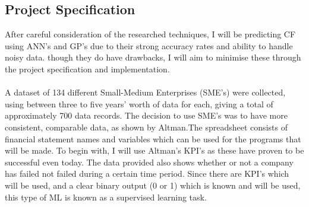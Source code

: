 \documentclass[11pt]{article}
\begin{document}
\subsection{Project Specification}
After careful consideration of the researched techniques, I will be predicting CF using ANN's and GP's due to their strong accuracy rates and ability to handle noisy data. though they do have drawbacks, I will aim to minimise these through the project specification and implementation.\\
\\
A dataset of 134 different Small-Medium Enterprises (SME's) were collected, using between three to five years' worth of data for each, giving a total of approximately 700 data records. The decision to use SME's was to have more consistent, comparable data, as shown by Altman.The spreadsheet consists of financial statement names and variables which can be used for the programs that will be made. To begin with, I will use Altman's KPI's as these have proven to be successful even today. 
The data provided also shows whether or not a company has failed not failed during a certain time period. Since there are KPI's which will be used, and a clear binary output (0 or 1) which is known and will be used, this type of ML is known as a supervised learning task. \\
\end{document}
